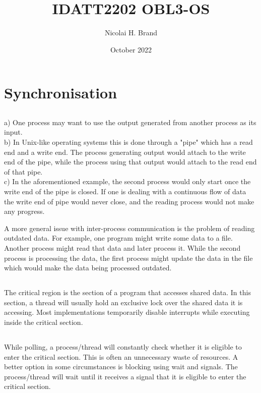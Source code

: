 \documentclass{article}
\title{IDATT2202 OBL3-OS}
\author{Nicolai H. Brand}
\date{October 2022}
\begin{document}
\maketitle

\section{Synchronisation}
\subsection{}
a) One process may want to use the output generated from another process as its input.\\

b) In Unix-like operating systems this is done through a "pipe" which has a read end and a write end. The process generating output would attach to the write end of the pipe, while the process using that output would attach to the read end of that pipe.\\

c) In the aforementioned example, the second process would only start once the write end of the pipe is closed. If one is dealing with a continuous flow of data the write end of pipe would never close, and the reading process would not make any progress.

A more general issue with inter-process communication is the problem of reading outdated data. For example, one program might write some data to a file. Another process might read that data and later process it. While the second process is processing the data, the first process might update the data in the file which would make the data being processed outdated.

\subsection{}
The critical region is the section of a program that accesses shared data. In this section, a thread will usually hold an exclusive lock over the shared data it is accessing. Most implementations temporarily disable interrupts while executing inside the critical section.

\subsection{}
While polling, a process/thread will constantly check whether it is eligible to enter the critical section. This is often an unnecessary waste of resources. A better option in some circumstances is blocking using wait and signals. The process/thread will wait until it receives a signal that it is eligible to enter the critical section.
\end{document}
